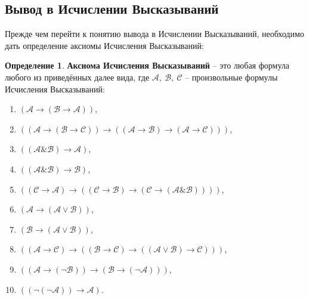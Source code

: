 \documentclass[a4paper,12pt]{article}
\theoremstyle{definition}
\newtheorem{definition}{Определение}
\begin{document}
	
	\subsection{Вывод в Исчислении Высказываний}
	
	Прежде чем перейти к понятию вывода в Исчислении Высказываний, необходимо дать определение аксиомы Исчисления Высказываний:
	
	\begin{definition}\label{axiomdef}
		\textbf{Аксиома Исчисления Высказываний} – это любая формула любого из приведённых далее вида, где $ \mathcal{A,\: B,\: C} $ – произвольные формулы Исчисления Высказываний: 
		\begin{enumerate}
			\item $ \left( \mathcal{A} \to \left( \mathcal{B} \to \mathcal{A} \right)  \right) $,
			\item $ \left(\left(\mathcal{A} \to \left( \mathcal{B} \to \mathcal{C} \right)  \right) \to \left( \left(\mathcal{A} \to \mathcal{B}\right) \to \left( \mathcal{A} \to \mathcal{C} \right)  \right)   \right)  $,
			\item $ \left(\left(  \mathcal{A} \& \mathcal{B}\right) \to \mathcal{A}\right)  $,
			\item $ \left(\left(  \mathcal{A} \& \mathcal{B}\right) \to \mathcal{B}\right)  $,
			\item $ \left(\left(\mathcal{C} \to \mathcal{A} \right) \to \left(  \left(\mathcal{C} \to \mathcal{B} \right)  \to \left( \mathcal{C} \to \left( \mathcal{A} \& \mathcal{B} \right)  \right)  \right)   \right)  $,
			\item $ \left( \mathcal{A} \to \left( \mathcal{A} \lor \mathcal{B} \right)   \right)  $,
			\item $ \left( \mathcal{B} \to \left( \mathcal{A} \lor \mathcal{B} \right)   \right)  $,
			\item $ \left(\left(\mathcal{A} \to \mathcal{C} \right) \to \left(  \left(\mathcal{B} \to \mathcal{C} \right)  \to \left( \left( \mathcal{A} \lor \mathcal{B} \right) \to \mathcal{C}  \right)  \right)   \right)  $,
			\item $ \left(  \left( \mathcal{A} \to \left( \lnot \mathcal{B} \right)  \right) \to    \left( \mathcal{B} \to \left( \lnot \mathcal{A} \right)  \right)        \right) $,
			\item $ \left(\left(\lnot \left( \lnot \mathcal{A}\right)\right)  \to \mathcal{A}   \right)  $.
		\end{enumerate}
	\end{definition}
	
\end{document}

